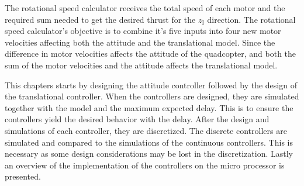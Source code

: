 The rotational speed calculator receives the total speed of each motor and the required sum needed to get the desired thrust for the $z\mathrm{_I}$ direction. The rotational speed calculator's objective is to combine it's five inputs into four new motor velocities affecting both the attitude and the translational model. Since the difference in motor velocities affects the attitude of the quadcopter, and both the sum of the motor velocities and the attitude affects the translational model.


This chapters starts by designing the attitude controller followed by the design of the translational controller. When the controllers are designed, they are simulated together with the model and the maximum expected delay. This is to ensure the controllers yield the desired behavior with the delay. After the design and simulations of each controller, they are discretized. The discrete controllers are simulated and compared to the simulations of the continuous controllers. This is necessary as some design considerations may be lost in the discretization. Lastly an overview of the implementation of the controllers on the micro processor is presented. 

